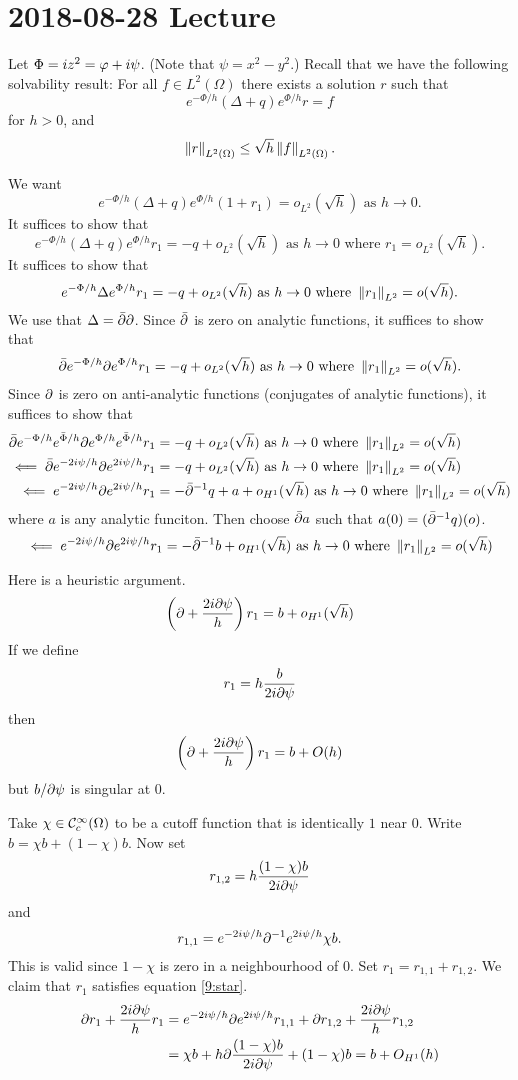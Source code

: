 \section{2018-08-28 Lecture}

Let $\Phi=iz^2=\varphi+i\psi$.
(Note that $\psi=x^2-y^2$.)
Recall that we have the following solvability result:
For all $f \in L^2(\Omega)$ there exists a solution $r$ such that
\[ e^{-\Phi/h}(\Delta+q)e^{\Phi/h}r=f \]
for $h>0$, and
\[ \left\lVert r \right\rVert_{L^2(\Omega)} \leq \sqrt{h} \left\lVert f \right\rVert_{L^2(\Omega)}. \]

We want
\[ e^{-\Phi/h}(\Delta+q)e^{\Phi/h}(1+r_1)=o_{L^2}(\sqrt{h}) \text{ as } h\to 0. \]
It suffices to show that
\[ e^{-\Phi/h}(\Delta+q)e^{\Phi/h}r_1=-q+o_{L^2}(\sqrt{h}) \text{ as } h\to 0 \text{ where } r_1=o_{L^2}(\sqrt{h}). \]
It suffices to show that
\[ e^{-\Phi/h}\Delta e^{\Phi/h}r_1=-q+o_{L^2}(\sqrt{h}) \text{ as } h\to 0 \text{ where } \left\lVert r_1 \right\rVert_{L^2}=o(\sqrt{h}). \]
We use that $\Delta=\bar{\partial}\partial$.
Since $\bar{\partial}$ is zero on analytic functions, it suffices to show that
\[ \bar{\partial} e^{-\Phi/h}\partial e^{\Phi/h}r_1=-q+o_{L^2}(\sqrt{h}) \text{ as } h\to 0 \text{ where }\left\lVert r_1 \right\rVert_{L^2}=o(\sqrt{h}). \]
Since $\partial$ is zero on anti-analytic functions (conjugates of analytic functions), it suffices to show that
\begin{align*}
  \bar{\partial} e^{-\Phi/h}e^{\bar\Phi/h}\partial e^{\Phi/h}e^{\bar\Phi/h}r_1&=-q+o_{L^2}(\sqrt{h}) \text{ as } h\to 0 \text{ where }\left\lVert r_1 \right\rVert_{L^2}=o(\sqrt{h}) \\
  \impliedby \bar{\partial} e^{-2i\psi/h}\partial e^{2i\psi/h}r_1&=-q+o_{L^2}(\sqrt{h}) \text{ as } h\to 0 \text{ where }\left\lVert r_1 \right\rVert_{L^2}=o(\sqrt{h}) \\
  \impliedby e^{-2i\psi/h}\partial e^{2i\psi/h}r_1&=-\bar{\partial}^{-1} q+a+o_{H^1}(\sqrt{h}) \text{ as } h\to 0 \text{ where }\left\lVert r_1 \right\rVert_{L^2}=o(\sqrt{h})
\end{align*}
where $a$ is any analytic funciton.
Then choose $\bar{\partial} a$ such that $a(0)=(\bar{\partial}^{-1} q)(o)$.
\[ \impliedby e^{-2i\psi/h}\partial e^{2i\psi/h}r_1=-\bar{\partial}^{-1} b+o_{H^1}(\sqrt{h}) \text{ as } h\to 0 \text{ where }\left\lVert r_1 \right\rVert_{L^2}=o(\sqrt{h}) \]

Here is a heuristic argument.
\begin{equation}
  \left( \partial+\frac{2i\partial\psi}{h} \right)r_1 = b+o_{H^1}(\sqrt{h})
  \label{9:star}
\end{equation}
If we define 
\[r_1=h\frac{b}{2i\partial\psi}\]
then
\[ \left( \partial+\frac{2i\partial\psi}{h} \right)r_1 = b+O(h) \]
but $b/\partial\psi$ is singular at $0$.

Take $\chi\in\mathcal{C}_c^\infty(\Omega)$ to be a cutoff function that is identically $1$ near $0$.
Write $b=\chi b+(1-\chi)b$.
Now set
\[ r_{1,2} = h \frac{(1-\chi)b}{2i\partial\psi} \]
and
\[ r_{1,1} = e^{-2i\psi/h}\partial^{-1} e^{2i\psi/h}\chi b. \]
This is valid since $1-\chi$ is zero in a neighbourhood of $0$.
Set $r_1=r_{1,1}+r_{1,2}$.
We claim that $r_1$ satisfies equation \ref{9:star}.
\begin{align*}
  \partial r_1 + \frac{2i\partial\psi}{h}r_1 &= e^{-2i\psi/h}\partial e^{2i\psi/h}r_{1,1}+\partial r_{1,2} + \frac{2i\partial\psi}{h}r_{1,2} \\
  &= \chi b +h\partial\frac{(1-\chi)b}{2i\partial\psi} + (1-\chi)b = b+O_{H^1}(h) \\
\end{align*}

